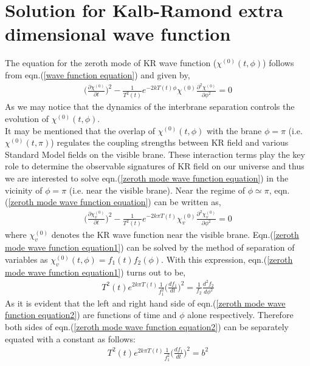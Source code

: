 \documentclass[a4paper]{article}
\begin{document}
 \section{Solution for Kalb-Ramond extra dimensional wave function}
The equation for the zeroth mode of KR wave function ($\chi^{(0)}(t,\phi)$) follows from eqn.(\ref{wave function equation}) and given by,
 \begin{eqnarray}
 \bigg(\frac{\partial\chi^{(0)}}{\partial t}\bigg)^2 
 - \frac{1}{T^2(t)}e^{-2kT(t)\phi}\chi^{(0)}\frac{\partial^2\chi^{(0)}}{\partial\phi^2} = 0
 \label{zeroth mode wave function equation}
\end{eqnarray}
As we may notice that the dynamics of the interbrane separation controls the evolution of $\chi^{(0)}(t,\phi)$.\\
It may be mentioned that the overlap of $\chi^{(0)}(t,\phi)$ with the brane $\phi=\pi$ (i.e. $\chi^{(0)}(t,\pi)$) regulates the 
coupling strengths between KR field and various Standard Model fields on the visible brane. These interaction terms play the key role 
to determine the observable signatures of KR field on our universe and thus we are interested to solve eqn.(\ref{zeroth mode wave function equation}) 
in the vicinity of $\phi=\pi$ (i.e. near the visible brane). Near the regime of $\phi \simeq \pi$, 
eqn.(\ref{zeroth mode wave function equation}) can be written as,
 \begin{eqnarray}
 \bigg(\frac{\partial\chi_v^{(0)}}{\partial t}\bigg)^2 
 - \frac{1}{T^2(t)}e^{-2k\pi T(t)}\chi_v^{(0)}\frac{\partial^2\chi_v^{(0)}}{\partial\phi^2} = 0
 \label{zeroth mode wave function equation1}
\end{eqnarray}
where $\chi_v^{(0)}$ denotes the KR wave function near the visible brane. Eqn.(\ref{zeroth mode wave function equation1}) can be solved by the 
method of separation of variables as $\chi_v^{(0)}(t,\phi) = f_1(t)f_2({\phi})$. With this expression, eqn.(\ref{zeroth mode wave function equation1}) 
turns out to be,
\begin{eqnarray}
 T^2(t)e^{2k\pi T(t)} \frac{1}{f_1^2}\bigg(\frac{df_1}{dt}\bigg)^2 = \frac{1}{f_2}\frac{d^2f_2}{d\phi^2}
 \label{zeroth mode wave function equation2}
\end{eqnarray}
As it is evident that the left and right hand side of eqn.(\ref{zeroth mode wave function equation2}) are functions of time and $\phi$ alone respectively. 
Therefore both sides of eqn.(\ref{zeroth mode wave function equation2}) can be separately equated with a constant as follows:
\begin{eqnarray}
 T^2(t)e^{2k\pi T(t)} \frac{1}{f_1^2}\bigg(\frac{df_1}{dt}\bigg)^2 = b^2
 \label{separation equation1}
\end{eqnarray}
\end{document}
